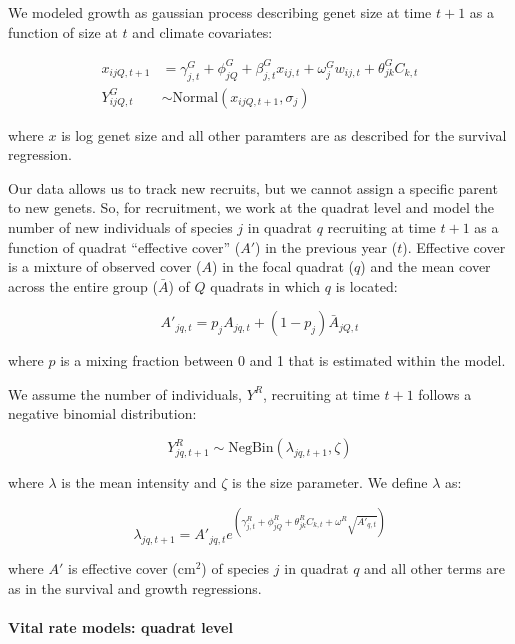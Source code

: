 \documentclass[12pt,]{article}
\begin{document}
We modeled growth as gaussian process describing genet size at time
$t+1$ as a function of size at $t$ and climate covariates:

\begin{align}
x_{ijQ,t+1} &= \gamma^{G}_{j,t} + \phi^{G}_{jQ} + \beta^{G}_{j,t}x_{ij,t} + \omega^{G}_{j}w_{ij,t} + \theta^{G}_{jk}C_{k,t} \\
Y^{G}_{ijQ,t} &\sim \text{Normal}(x_{ijQ,t+1}, \sigma_{j})
\end{align}

where $x$ is log genet size and all other paramters are as described for
the survival regression.

Our data allows us to track new recruits, but we cannot assign a
specific parent to new genets. So, for recruitment, we work at the
quadrat level and model the number of new individuals of species $j$ in
quadrat $q$ recruiting at time $t+1$ as a function of quadrat
``effective cover'' ($A'$) in the previous year ($t$). Effective cover
is a mixture of observed cover ($A$) in the focal quadrat ($q$) and the
mean cover across the entire group ($\bar{A}$) of $Q$ quadrats in which
$q$ is located:

\begin{equation}
A'_{jq,t} = p_{j}A_{jq,t} + (1-p_{j})\bar{A}_{jQ,t}
\end{equation}

where $p$ is a mixing fraction between 0 and 1 that is estimated within
the model.

We assume the number of individuals, $Y^{R}$, recruiting at time $t+1$
follows a negative binomial distribution:

\begin{equation}
Y^{R}_{jq,t+1} \sim \text{NegBin}(\lambda_{jq,t+1},\zeta)
\end{equation}

where $\lambda$ is the mean intensity and $\zeta$ is the size parameter.
We define $\lambda$ as:

\begin{equation}
\lambda_{jq,t+1} = A'_{jq,t}e^{(\gamma^{R}_{j,t} + \phi^{R}_{jQ} + \theta^{R}_{jk}C_{k,t} + \omega^{R}\sqrt{A'_{q,t}})}
\end{equation}

where $A'$ is effective cover ($\text{cm}^2$) of species $j$ in quadrat
$q$ and all other terms are as in the survival and growth regressions.

\paragraph{Vital rate models: quadrat
level}\label{vital-rate-models-quadrat-level}
\end{document}
